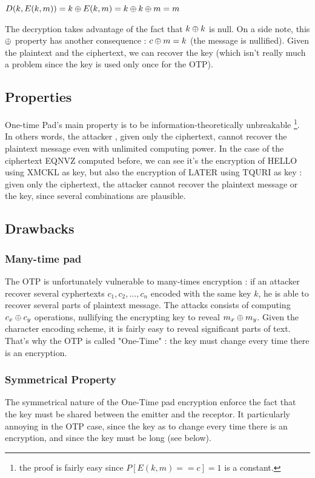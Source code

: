 \begin{mytheorem}
    $ D(k, E(k,m) ) = k \oplus E(k,m) = k \oplus k \oplus m = m $
\end{mytheorem}

The decryption takes advantage of the fact that $k \oplus k$ is null. On a side note, this $\oplus$ property has another consequence : $ c \oplus m = k $ (the message is nullified). Given the plaintext and the ciphertext, we can recover the key (which isn't really much a problem since the key is used only once for the OTP).

\subsection{Properties}

One-time Pad's main property is to be information-theoretically unbreakable \footnote{the proof is fairly easy since $P[E(k,m) == c] = 1$ is a constant.}. In others words, the attacker , given only the ciphertext, cannot recover the plaintext message even with unlimited computing power. In the case of the ciphertext EQNVZ computed before, we can see it's the encryption of HELLO using XMCKL as key, but also the encryption of LATER using TQURI as key : given only the ciphertext, the attacker cannot recover the plaintext message or the key, since several combinations are plausible.
	
\subsection{Drawbacks}

\subsubsection{Many-time pad}
The OTP is unfortunately vulnerable to many-times encryption : if an attacker recover several cyphertexts ${c_1,c_2,...,c_n}$ encoded with the same key $k$, he is able to recover several parts of plaintext message. The attacks consists of computing $c_x\oplus c_y$ operations, nullifying the encrypting key to reveal $m_x\oplus m_y$. Given the character encoding scheme, it is fairly easy to reveal significant parts of text. That's why the OTP is called "One-Time" : the key must change every time there is an encryption. 

\subsubsection{Symmetrical Property}
The symmetrical nature of the One-Time pad encryption enforce the fact that the key must be shared between the emitter and the receptor. It particularly annoying in the OTP case, since the key as to change every time there is an encryption, and since the key must be long (see below).

